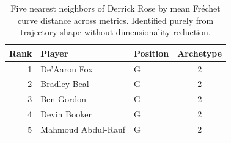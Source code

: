 \begin{table}[htbp]
  \centering\small
  \begin{tabular}{rllc}
    \toprule
    Rank & Player & Position & Archetype \\
    \midrule
    1 & De'Aaron Fox & G & 2 \\
    2 & Bradley Beal & G & 2 \\
    3 & Ben Gordon & G & 2 \\
    4 & Devin Booker & G & 2 \\
    5 & Mahmoud Abdul-Rauf & G & 2 \\
    \bottomrule
  \end{tabular}
  \caption{Five nearest neighbors of Derrick Rose by mean Fr\'{e}chet curve distance across metrics. Identified purely from trajectory shape without dimensionality reduction.}
  \label{tab:Derrick_Rose_frechet_curve_neighbors}
\end{table}


